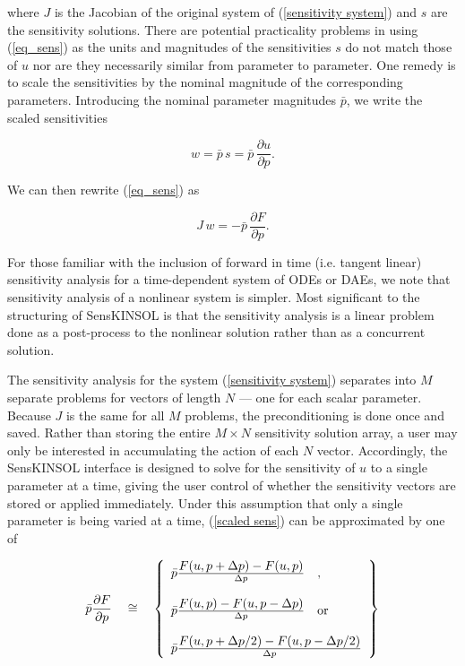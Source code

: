 \documentclass[11pt]{article}
\begin{document}
where $J$ is the Jacobian of the original system of (\ref{sensitivity
system}) and $s$ are the sensitivity solutions. There are potential
practicality problems in using (\ref{eq_sens}) as the units and
magnitudes of the sensitivities $s$ do not match those of $u$ nor are
they necessarily similar from parameter to parameter. One remedy is to
scale the sensitivities by the nominal magnitude of the corresponding
parameters. Introducing the nominal parameter magnitudes $\bar{p}$, we
write the scaled sensitivities

\begin{equation}
w = \bar p\, s = \bar p\, \frac{{\partial u}}{{\partial p}} . \label{scaled sens}
\end{equation}

We can then rewrite (\ref{eq_sens}) as

\begin{equation}
J\,w =  - \bar p\, \frac{{\partial F}}{{\partial p}} .
\end{equation}

For those familiar with the inclusion of forward in time (i.e. tangent
linear) sensitivity analysis for a time-dependent system of ODEs or
DAEs, we note that sensitivity analysis of a nonlinear system is
simpler. Most significant to the structuring of SensKINSOL is that the
sensitivity analysis is a linear problem done as a post-process to the
nonlinear solution rather than as a concurrent solution.

The sensitivity analysis for the system (\ref{sensitivity system})
separates into $M$ separate problems for vectors of length $N$ --- one
for each scalar parameter. Because $J$ is the same for all $M$
problems, the preconditioning is done once and saved. Rather than
storing the entire $M\times N$ sensitivity solution array, a user may
only be interested in accumulating the action of each $N$ vector.
Accordingly, the SensKINSOL interface is designed to solve for the
sensitivity of $u$ to a single parameter at a time, giving the user
control of whether the sensitivity vectors are stored or applied
immediately. Under this assumption that only a single parameter is
being varied at a time, (\ref{scaled sens}) can be approximated by one
of

\medskip
\begin{equation}
\bar p\frac{{\partial F}}{{\partial p}}\quad  \cong \quad
\left\{\begin{array}{*{20}c}
   {\bar p\frac{\displaystyle{F(u,p + \Delta p) - F(u,p)}}{{\Delta p}}\quad ,} \hfill  \\
   \\
   {\bar p\frac{\displaystyle{F(u,p) - F(u,p - \Delta p)}}{{\Delta p}}\quad {\rm or}} \hfill  \\
   \\
   {\bar p\frac{\displaystyle{F(u,p + {{\Delta p} \mathord{\left/
 {\vphantom {{\Delta p} 2}} \right.
 \kern-\nulldelimiterspace} 2}) - F(u,p - {{\Delta p} \mathord{\left/
 {\vphantom {{\Delta p} 2}} \right.
 \kern-\nulldelimiterspace} 2})}}{{\Delta p}}} \hfill  \\
\end{array}\right\}
\end{equation}
\end{document}
